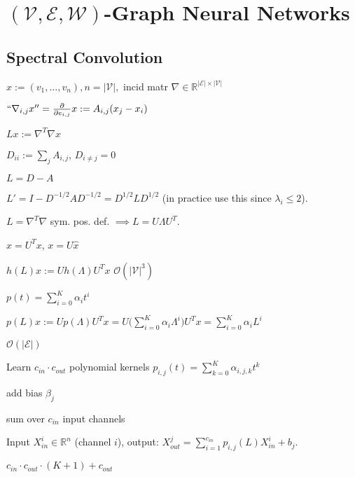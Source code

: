 \section{$(\mathcal{V},\mathcal{E},\mathcal{W})$-Graph Neural Networks }
\subsection*{Spectral Convolution}
$x:=(v_1,\dots,v_n), n=|\mathcal{V}|,$ incid matr $\nabla\in\mathbb{R}^{|\mathcal{E}|\times |\mathcal{V}|}$

 $``\nabla_{i,j}x''=\frac{\partial}{\partial e_{i,j}}x:=A_{i,j}(x_j-x_i)$

 $Lx:=\nabla^T\nabla x$

 $D_{ii}:=\sum_j A_{i,j}$, $D_{i\neq j}=0$

 $L=D-A$

 $L'=I-D^{-1/2}AD^{-1/2}=D^{1/2}LD^{1/2}$ (in practice use this since $\lambda_i\le 2$).

$L=\nabla^T\nabla$ sym. pos. def. $\implies L=U\Lambda U^T$.

 $\hat{x}=U^Tx$, $x=U\hat{x}$

 $h(L)x:=Uh(\Lambda)U^Tx$
 $\mathcal{O}(|\mathcal{V}|^3)$

 $p(t)=\sum^K_{i=0}\alpha_i t^i$

$p(L)x:=Up(\Lambda)U^Tx=U\Big(\sum^K_{i=0}\alpha_i\Lambda^i\Big)U^Tx=\sum^K_{i=0}\alpha_i L^i$

 $\mathcal{O}(|\mathcal{E}|)$

\begin{inparaitem}[$\color{mygreen} \triangleright$]
\item Learn $c_{in}\cdot c_{out}$ polynomial kernels $p_{i,j}(t)=\sum^K_{k=0}\alpha_{i,j,k}t^k$
\item add bias $\beta_j$
\item sum over $c_{in}$ input channels
\end{inparaitem}

 Input $X^i_{in}\in\mathbb{R}^n$ (channel $i$), output:
$X^j_{out}=\sum^{c_{in}}_{i=1}p_{i,j}(L)X^i_{in}+b_j$.

 $c_{in} \cdot c_{out}\cdot (K+1)+c_{out}$

